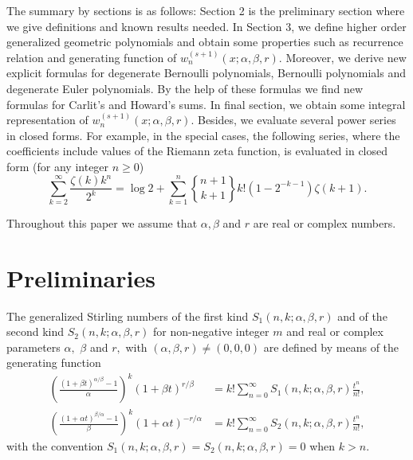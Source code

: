 \documentclass{article}%
\begin{document}
The summary by sections is as follows: Section 2 is the preliminary section
where we give definitions and known results needed. In Section 3, we define
higher order generalized geometric polynomials and obtain some properties such
as recurrence relation and generating function of $w_{n}^{\left(  s+1\right)
}\left(  x;\alpha,\beta,r\right)  .$ Moreover, we derive new explicit formulas
for degenerate Bernoulli polynomials, Bernoulli polynomials and degenerate
Euler polynomials. By the help of these formulas we find new formulas for
Carlit's and Howard's sums. In final section, we obtain some integral
representation of $w_{n}^{\left(  s+1\right)  }\left(  x;\alpha,\beta
,r\right)  $. Besides, we evaluate several power series in closed forms. For
example, in the special cases, the following series, where the coefficients
include values of the Riemann zeta function, is evaluated in closed form (for
any integer $n\geq0$)%
\[
\sum_{k=2}^{\infty}\frac{\zeta\left(  k\right)  k^{n}}{2^{k}}=\log2+\sum
_{k=1}^{n}%
\genfrac{\{}{\}}{0pt}{}{n+1}{k+1}%
k!\left(  1-2^{-k-1}\right)  \zeta\left(  k+1\right)  .
\]


Throughout this paper we assume that $\alpha,\beta$ and $r$ are real or
complex numbers.

\section{Preliminaries}

The generalized Stirling numbers of the first kind $S_{1}\left(
n,k;\alpha,\beta,r\right)  $ and of the second kind $S_{2}\left(
n,k;\alpha,\beta,r\right)  $ for non-negative integer $m$ and real or complex
parameters $\alpha,$ $\beta$ and $r,$ with $\left(  \alpha,\beta,r\right)
\neq\left(  0,0,0\right)  $ are defined by means of the generating function
\cite{HSU}%
\begin{align*}
\left(  \frac{\left(  1+\beta t\right)  ^{\alpha/\beta}-1}{\alpha}\right)
^{k}\left(  1+\beta t\right)  ^{r/\beta}  &  =k!\sum_{n=0}^{\infty}%
S_{1}\left(  n,k;\alpha,\beta,r\right)  \frac{t^{n}}{n!},\\
\left(  \frac{\left(  1+\alpha t\right)  ^{\beta/\alpha}-1}{\beta}\right)
^{k}\left(  1+\alpha t\right)  ^{-r/\alpha}  &  =k!\sum_{n=0}^{\infty}%
S_{2}\left(  n,k;\alpha,\beta,r\right)  \frac{t^{n}}{n!},
\end{align*}
with the convention $S_{1}\left(  n,k;\alpha,\beta,r\right)  =S_{2}\left(
n,k;\alpha,\beta,r\right)  =0$ when $k>n.$
\end{document}
